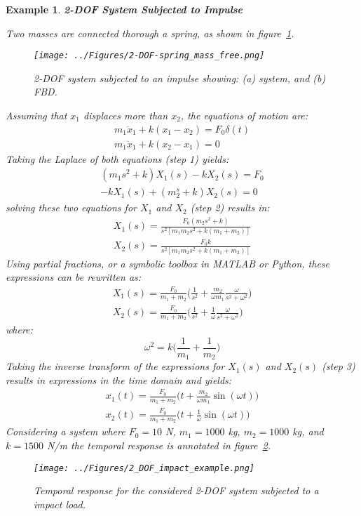 \documentclass[12pt,letter]{article}
\newtheorem{ex}{Example}
\numberwithin{ex}{section} %
\newenvironment{example}{\begin{mdframed}[middlelinewidth=0.5mm]\begin{ex}\normalfont}{\end{ex}\end{mdframed}}
\numberwithin{re}{section} %
\begin{document}
\begin{example}
\textbf{2-DOF System Subjected to Impulse}

Two masses are connected thorough a spring, as shown in figure~\ref{fig:2-DOF-spring_mass_free}. 
\begin{figure}[H]
	\centering
	\texttt{[image: ../Figures/2-DOF-spring\_mass\_free.png]}
	\caption{2-DOF system subjected to an impulse showing: (a) system, and (b) FBD.}
	\label{fig:2-DOF-spring_mass_free}
\end{figure}
Assuming that $x_1$ displaces more than $x_2$, the equations of motion are:
\begin{eqnarray}
m_1\ddot{x}_1 + k(x_1-x_2)  = F_0 \delta (t) \\
m_1\ddot{x}_1 + k(x_2-x_1)  = 0  \nonumber
\end{eqnarray}
Taking the Laplace of both equations (step 1) yields:
\begin{eqnarray}
(m_1 s^2 +k)X_1(s) - k X_2(s) = F_0 \\
-k X_1(s) + (m_2^s + k) X_2(s) = 0  \nonumber
\end{eqnarray}
solving these two equations for $X_1$ and $X_2$ (step 2) results in:
\begin{eqnarray}
X_1(s) = \frac{F_0(m_2 s^2 +k)}{s^2 [m_1 m_2 s^2 + k (m_1 + m_2)]} \\
X_2(s) = \frac{F_0 k}{s^2 [m_1 m_2 s^2 + k (m_1 + m_2)]} \nonumber
\end{eqnarray}
Using partial fractions, or a symbolic toolbox in MATLAB or Python, these expressions can be rewritten as:
\begin{eqnarray}
X_1(s) = \frac{F_0}{m_1 + m_2} \bigg( \frac{1}{s^2} + \frac{m_2}{\omega m_1} \frac{\omega}{s^2 + \omega^2} \bigg) \\
X_2(s) = \frac{F_0}{m_1 + m_2} \bigg( \frac{1}{s^2} + \frac{1}{\omega} \frac{\omega}{s^2 + \omega^2} \bigg) \nonumber
\end{eqnarray}
where:
\begin{equation}
\omega^2 = k \bigg( \frac{1}{m_1} + \frac{1}{m_2} \bigg)
\end{equation}
Taking the inverse transform of the expressions for $X_1(s)$ and $X_2(s)$ (step 3) results in expressions in the time domain and yields:
\begin{eqnarray}
x_1(t) = \frac{F_0}{m_1 + m_2} \bigg( t + \frac{m_2}{\omega m_1} \sin (\omega t) \bigg) \\
x_2(t) = \frac{F_0}{m_1 + m_2} \bigg( t + \frac{1}{\omega} \sin (\omega t) \bigg) \nonumber
\end{eqnarray}
Considering a system where $F_0=10$ N, $m_1=1000$ kg, $m_2=1000$ kg, and $k=1500$ N/m the temporal response is annotated in figure~\ref{fig:2_DOF_impact_example}. 


\begin{figure}[H]
	\centering
	\texttt{[image: ../Figures/2\_DOF\_impact\_example.png]}
	\caption{Temporal response for the considered 2-DOF system subjected to a impact load.}
	\label{fig:2_DOF_impact_example}
\end{figure}


\end{example}
\end{document}
